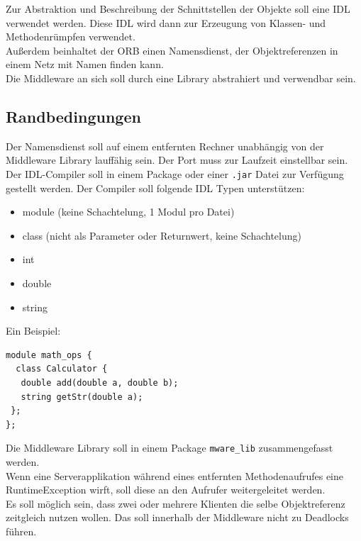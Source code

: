 \documentclass{article}
\begin{document}
Zur Abstraktion und Beschreibung der Schnittstellen der Objekte soll eine IDL verwendet werden.
Diese IDL wird dann zur Erzeugung von Klassen- und Methodenrümpfen verwendet.\\

Außerdem beinhaltet der ORB einen Namensdienst, der Objektreferenzen in einem Netz mit Namen finden
kann.\\

Die Middleware an sich soll durch eine Library abstrahiert und verwendbar sein.

\subsection{Randbedingungen}
Der Namensdienst soll auf einem entfernten Rechner unabhängig von der Middleware Library
lauffähig sein. Der Port muss zur Laufzeit einstellbar sein.\\

Der IDL-Compiler soll in einem Package oder einer \texttt{.jar} Datei zur Verfügung gestellt
werden. Der Compiler soll folgende IDL Typen unterstützen:

\begin{itemize}
    \item module (keine Schachtelung, 1 Modul pro Datei)
    \item class (nicht als Parameter oder Returnwert, keine Schachtelung)
    \item int
    \item double
    \item string
\end{itemize}

Ein Beispiel:
\begin{lstlisting}
module math_ops {
  class Calculator {
   double add(double a, double b);
   string getStr(double a);
 };
};
\end{lstlisting}

Die Middleware Library soll in einem Package \texttt{mware\_lib} zusammengefasst werden.\\

Wenn eine Serverapplikation während eines entfernten Methodenaufrufes eine RuntimeException
wirft, soll diese an den Aufrufer weitergeleitet werden.\\

Es soll möglich sein, dass zwei oder mehrere Klienten die selbe Objektreferenz zeitgleich
nutzen wollen. Das soll innerhalb der Middleware nicht zu Deadlocks führen.
\end{document}
